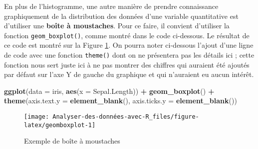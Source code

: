 \documentclass[
  french,
]{book}
\newenvironment{Shaded}{\begin{snugshade}}{\end{snugshade}}
\newcommand{\DataTypeTok}[1]{\textcolor[rgb]{0.13,0.29,0.53}{#1}}
\newcommand{\KeywordTok}[1]{\textcolor[rgb]{0.13,0.29,0.53}{\textbf{#1}}}
\newcommand{\NormalTok}[1]{#1}
\newcommand{\OperatorTok}[1]{\textcolor[rgb]{0.81,0.36,0.00}{\textbf{#1}}}
\newcommand{\StringTok}[1]{\textcolor[rgb]{0.31,0.60,0.02}{#1}}
\begin{document}
En plus de l'histogramme, une autre manière de prendre connaissance graphiquement de la distribution des données d'une variable quantitative est d'utiliser une \textbf{boîte à moustaches}. Pour ce faire, il convient d'utiliser la fonction \texttt{geom\_boxplot()}, comme montré dans le code ci-dessous. Le résultat de ce code est montré sur la Figure \ref{fig:geomboxplot}. On pourra noter ci-dessous l'ajout d'une ligne de code avec une fonction \texttt{theme()} dont on ne présentera pas les détails ici ; cette fonction nous sert juste ici à ne pas montrer des chiffres qui auraient été ajoutés par défaut sur l'axe Y de gauche du graphique et qui n'auraient eu aucun intérêt.

\begin{Shaded}
\begin{Highlighting}[]
\KeywordTok{ggplot}\NormalTok{(}\DataTypeTok{data =}\NormalTok{ iris, }\KeywordTok{aes}\NormalTok{(}\DataTypeTok{x =}\NormalTok{ Sepal.Length)) }\OperatorTok{+}\StringTok{ }
\StringTok{  }\KeywordTok{geom_boxplot}\NormalTok{() }\OperatorTok{+}
\StringTok{    }\KeywordTok{theme}\NormalTok{(}\DataTypeTok{axis.text.y =} \KeywordTok{element_blank}\NormalTok{(), }
          \DataTypeTok{axis.ticks.y =} \KeywordTok{element_blank}\NormalTok{())}
\end{Highlighting}
\end{Shaded}

\begin{figure}

{\centering \texttt{[image: Analyser-des-données-avec-R\_files/figure-latex/geomboxplot-1]} 

}

\caption{Exemple de boîte à moustaches}\label{fig:geomboxplot}
\end{figure}
\end{document}
